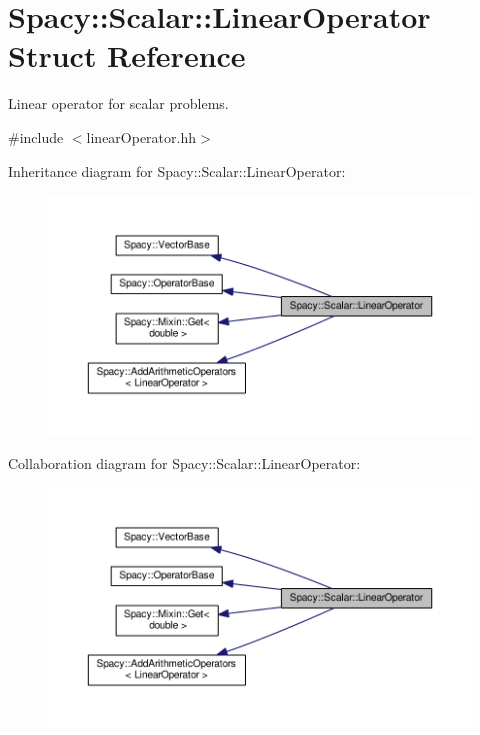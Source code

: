 \hypertarget{structSpacy_1_1Scalar_1_1LinearOperator}{}\section{Spacy\+:\+:Scalar\+:\+:Linear\+Operator Struct Reference}
\label{structSpacy_1_1Scalar_1_1LinearOperator}


Linear operator for scalar problems.  




{\ttfamily \#include $<$linear\+Operator.\+hh$>$}



Inheritance diagram for Spacy\+:\+:Scalar\+:\+:Linear\+Operator\+:
\nopagebreak
\begin{figure}[H]
\begin{center}
\leavevmode
\includegraphics[width=350pt]{structSpacy_1_1Scalar_1_1LinearOperator__inherit__graph}
\end{center}
\end{figure}


Collaboration diagram for Spacy\+:\+:Scalar\+:\+:Linear\+Operator\+:
\nopagebreak
\begin{figure}[H]
\begin{center}
\leavevmode
\includegraphics[width=350pt]{structSpacy_1_1Scalar_1_1LinearOperator__coll__graph}
\end{center}
\end{figure}
